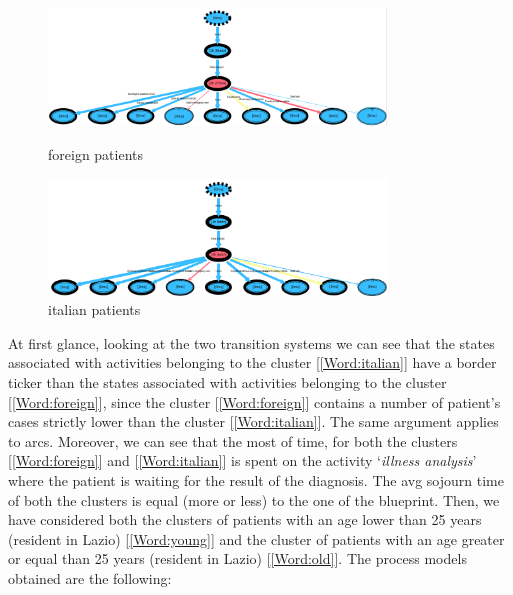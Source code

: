 \begin{figure} [h]
\includegraphics[width=0.8\textwidth]{ProntoSoccorsoSojournForeigns}
\caption{foreign patients}
\includegraphics[width=0.8\textwidth]{ProntoSoccorsoSojournItalians}
\caption{italian patients}
\end{figure} \newline
At first glance, looking at the two transition systems we can see that the states associated with activities belonging to the cluster [\ref{Word:italian}] have a border ticker than the states associated with activities belonging to the cluster [\ref{Word:foreign}], since the cluster [\ref{Word:foreign}] contains a number of patient's cases strictly lower than the cluster [\ref{Word:italian}]. The same argument applies to arcs. Moreover, we can see that the most of time, for both the clusters [\ref{Word:foreign}] and [\ref{Word:italian}] is spent on the activity `\textit{illness analysis}' where the patient is waiting for the result of the diagnosis. The avg sojourn time of both the clusters is equal (more or less) to the one of the blueprint. Then, we have considered both the clusters of patients with an age lower than 25 years (resident in Lazio) [\ref{Word:young}] and the cluster of patients with an age greater or equal than 25 years (resident in Lazio) [\ref{Word:old}]. The process models obtained are the following:
